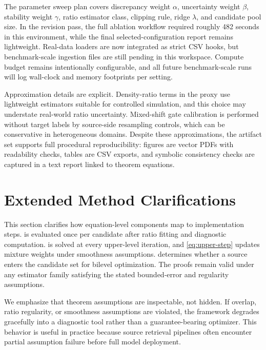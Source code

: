 \documentclass{article} %
\begin{document}
The parameter sweep plan covers discrepancy weight \(\alpha\), uncertainty weight \(\beta\), stability weight \(\gamma\), ratio estimator class, clipping rule, ridge \(\lambda\), and candidate pool size. In the revision pass, the full ablation workflow required roughly 482 seconds in this environment, while the final selected-configuration report remains lightweight. Real-data loaders are now integrated as strict CSV hooks, but benchmark-scale ingestion files are still pending in this workspace. Compute budget remains intentionally configurable, and all future benchmark-scale runs will log wall-clock and memory footprints per setting.

Approximation details are explicit. Density-ratio terms in the proxy use lightweight estimators suitable for controlled simulation, and this choice may understate real-world ratio uncertainty. Mixed-shift gate calibration is performed without target labels by source-side resampling controls, which can be conservative in heterogeneous domains. Despite these approximations, the artifact set supports full procedural reproducibility: figures are vector PDFs with readability checks, tables are CSV exports, and symbolic consistency checks are captured in a text report linked to theorem equations.

\section{Extended Method Clarifications}
This section clarifies how equation-level components map to implementation steps.  is evaluated once per candidate after ratio fitting and diagnostic computation.  is solved at every upper-level iteration, and \eqref{eq:upper-step} updates mixture weights under smoothness assumptions.  determines whether a source enters the candidate set for bilevel optimization. The proofs remain valid under any estimator family satisfying the stated bounded-error and regularity assumptions.

We emphasize that theorem assumptions are inspectable, not hidden. If overlap, ratio regularity, or smoothness assumptions are violated, the framework degrades gracefully into a diagnostic tool rather than a guarantee-bearing optimizer. This behavior is useful in practice because source retrieval pipelines often encounter partial assumption failure before full model deployment.
\end{document}
